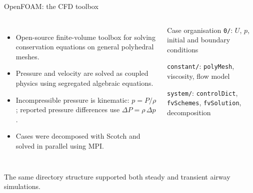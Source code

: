 \documentclass[aspectratio=169,11pt]{beamer}
\begin{document}
\begin{frame}{OpenFOAM: the CFD toolbox}
  \begin{columns}[T,onlytextwidth]
      \begin{itemize}
        \item Open-source finite-volume toolbox for solving conservation equations on general polyhedral meshes.
        \item Pressure and velocity are solved as coupled physics using segregated algebraic equations.
        \item Incompressible pressure is kinematic: $p=P/\rho$; reported pressure differences use $\Delta P=\rho\,\Delta p$.
        \item Cases were decomposed with Scotch and solved in parallel using MPI.
      \end{itemize}
      \begin{block}{Case organisation}
        \texttt{0/}: $U$, $p$, initial and boundary conditions

        \medskip
        \texttt{constant/}: \texttt{polyMesh}, viscosity, flow model

        \medskip
        \texttt{system/}: \texttt{controlDict}, \texttt{fvSchemes}, \texttt{fvSolution}, decomposition
      \end{block}
  \end{columns}
  \vspace{0.2em}
  \centering\small The same directory structure supported both steady and transient airway simulations.
\end{frame}
\end{document}
